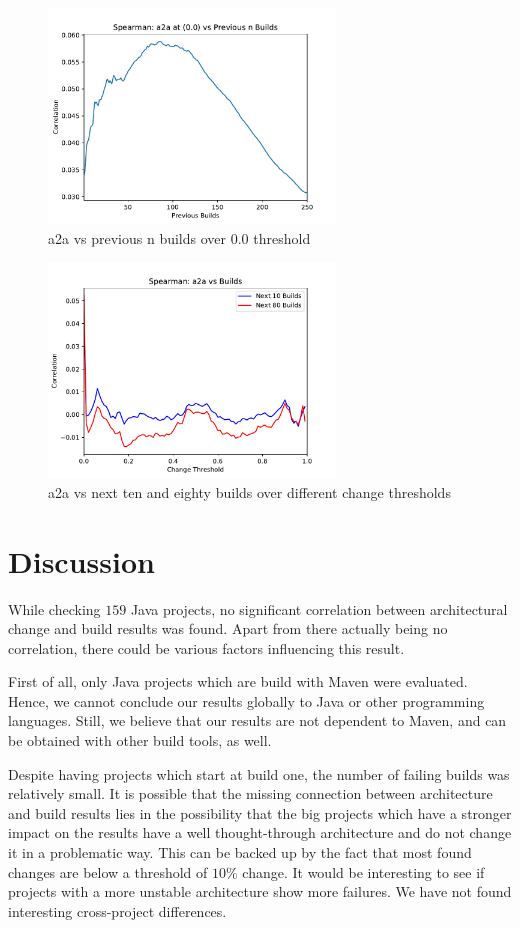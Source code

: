 \documentclass[sigplan, anonymous, review]{acmart}
\begin{document}
\begin{figure}[!t]
	\centering
	\includegraphics[width=3in]{assets/PrevN}
	\caption{a2a vs previous n builds over 0.0 threshold }
	\label{a2aPrevN}
\end{figure}

\begin{figure}[!t]
	\centering
	\includegraphics[width=3in]{assets/a2aCorr}
	\caption{a2a vs next ten and eighty builds over different change thresholds }
	\label{a2aPlot}
\end{figure}


\section{Discussion}

While checking $159$ Java projects, no significant correlation between architectural change and build results was found. Apart from there actually being no correlation, there could be various factors influencing this result. 

First of all, only Java projects which are build with Maven were evaluated. Hence, we cannot conclude our results globally to Java or other programming languages. Still, we believe that our results are not dependent to Maven, and can be obtained with other build tools, as well. 

Despite having projects which start at build one, the number of failing builds was relatively small. 
It is possible that the missing connection between architecture and build results lies in the possibility that the big projects which have a stronger impact on the results have a well thought-through architecture and do not change it in a problematic way.
This can be backed up by the fact that most found changes are below a threshold of $10\%$ change. It would be interesting to see if projects with a more unstable architecture show more failures. We have not found interesting cross-project differences.
\end{document}
